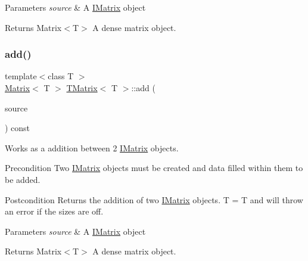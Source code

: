\begin{DoxyParams}{Parameters}
{\em source} & A \mbox{\hyperlink{class_i_matrix}{I\+Matrix}} object \\
\hline
\end{DoxyParams}
\begin{DoxyReturn}{Returns}
Matrix$<$\+T$>$ A dense matrix object. 
\end{DoxyReturn}
\mbox{\label{class_t_matrix_a244754d9ce3532e62cead25de6890533}} 
\subsubsection{\texorpdfstring{add()}{add()}\hspace{0.1cm}{\footnotesize\ttfamily [2/6]}}
{\footnotesize\ttfamily template$<$class T $>$ \\
\mbox{\hyperlink{class_matrix}{Matrix}}$<$ T $>$ \mbox{\hyperlink{class_t_matrix}{T\+Matrix}}$<$ T $>$\+::add (\begin{DoxyParamCaption}\item[{const \mbox{\hyperlink{class_i_matrix}{I\+Matrix}}$<$ \mbox{\hyperlink{class_t_matrix}{T\+Matrix}}$<$ T $>$, T $>$ \&}]{source }\end{DoxyParamCaption}) const\hspace{0.3cm}{\ttfamily [virtual]}}



Works as a addition between 2 \mbox{\hyperlink{class_i_matrix}{I\+Matrix}} objects. 

\begin{DoxyPrecond}{Precondition}
Two \mbox{\hyperlink{class_i_matrix}{I\+Matrix}} objects must be created and data filled within them to be added. 
\end{DoxyPrecond}
\begin{DoxyPostcond}{Postcondition}
Returns the addition of two \mbox{\hyperlink{class_i_matrix}{I\+Matrix}} objects. T = T and will throw an error if the sizes are off.
\end{DoxyPostcond}

\begin{DoxyParams}{Parameters}
{\em source} & A \mbox{\hyperlink{class_i_matrix}{I\+Matrix}} object \\
\hline
\end{DoxyParams}
\begin{DoxyReturn}{Returns}
Matrix$<$\+T$>$ A dense matrix object. 
\end{DoxyReturn}


